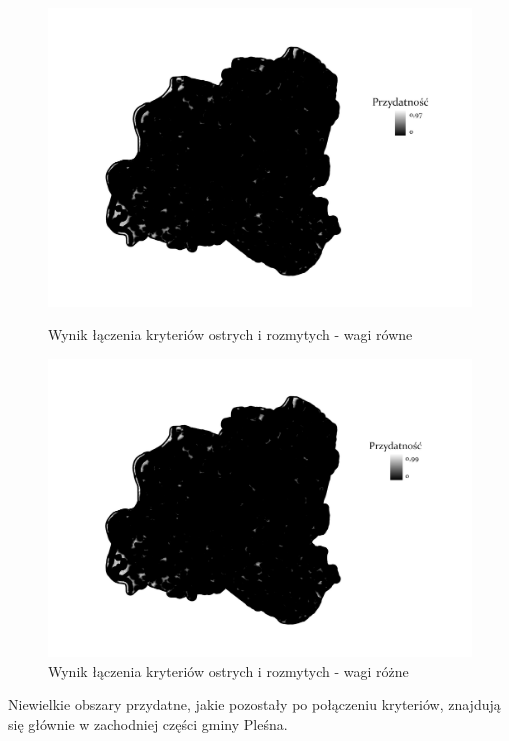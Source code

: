 \documentclass{article}
\begin{document}
\begin{figure}[H]
    \begin{minipage}[t]{0.48\textwidth}
        \centering
        \includegraphics[width=\linewidth]{img/plesna-wynik.jpg}
        \caption{Wynik łączenia kryteriów ostrych i rozmytych - wagi równe}
        \label{fig:wynik-rowne}
    \end{minipage}
    \hfill
    \begin{minipage}[t]{0.48\textwidth}
        \centering
        \includegraphics[width=\linewidth]{img/roznewagi-plesna-wynik.jpg}
        \caption{Wynik łączenia kryteriów ostrych i rozmytych - wagi różne}
        \label{fig:wynik-rozne}
    \end{minipage}
\end{figure}
Niewielkie obszary przydatne, jakie pozostały po połączeniu kryteriów, znajdują się głównie w zachodniej części gminy Pleśna.
\end{document}
